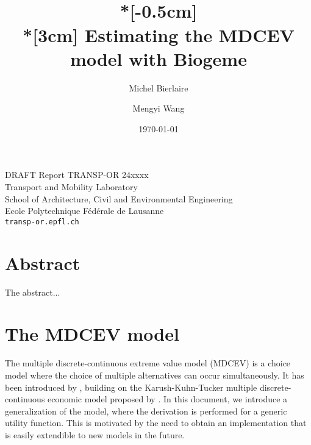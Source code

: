 \documentclass[12pt,a4paper]{article}
\title{
  \vspace{-3cm}
  \epsfig{figure=transp-or.eps,height=2cm}
  \hfill
  \epsfig{figure=epfl,height=1.5cm}   \\*[-0.5cm]
  \mbox{}\hrulefill\mbox{} \\*[3cm] Estimating the MDCEV model with Biogeme}
\author{Michel Bierlaire \and Mengyi Wang}
\date{\today}
\begin{document}
\begin{titlepage}
\pagestyle{empty}

\maketitle
\vspace{2cm}


\begin{center}
  DRAFT
\small Report TRANSP-OR 24xxxx \\ Transport and Mobility Laboratory \\ School of Architecture, Civil and Environmental Engineering \\ Ecole Polytechnique F\'ed\'erale de Lausanne \\ \verb+transp-or.epfl.ch+
\end{center}


\end{titlepage}


\section*{Abstract}

The abstract...
\section{The MDCEV model}

The multiple discrete-continuous extreme value model (MDCEV) is a
choice model where the choice of multiple alternatives can occur
simultaneously. It has been introduced by ,
building on the Karush-Kuhn-Tucker multiple discrete-continuous economic
model proposed by . In this document, we introduce a generalization of the model,
where the derivation is performed for a generic utility function. This is motivated by the need to obtain an
implementation that is easily extendible to new models in the future.
\end{document}
